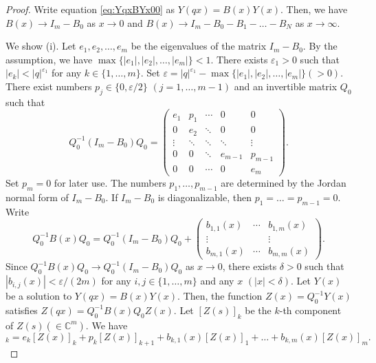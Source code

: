 \documentclass[10pt,a4paper]{amsart}
\begin{document}
\begin{proof}
Write equation \eqref{eq:YqxBYx00} as
$
Y(q x) = B(x) Y(x) $.
Then, we have $B(x) \to I_m -B_0$ as $x \to 0$ and $B(x) \to I_m -B_0 -B_1 - \dots - B_N$ as $x \to \infty$.

We show (i).
Let $e_1, e_2, \dots ,e_m$ be the eigenvalues of the matrix $I_m- B_0 $.
By the assumption, we have $\max \{ |e_1|, |e_2|, \dots , |e_m| \} <1 $.
There exists $\varepsilon _1 >0$ such that $|e_k | <|q|^{\varepsilon _1} $ for any $k \in \{1, \dots ,m \}$.
Set $ \varepsilon = |q|^{\varepsilon _1} - \max \{ |e_1|, |e_2|, \dots , |e_m| \} (>0)$.
There exist numbers $p_j \in \{ 0, \varepsilon /2 \}$ $(j=1, \dots , m-1)$ and an invertible matrix $Q_0$ such that
\begin{equation*}
 Q_0^{-1} ( I_m -B_0 ) Q_0 =
\begin{pmatrix}
e_1 & p_1 & \cdots & 0 & 0 \\
0 & e_2 & \ddots & 0 & 0 \\
\vdots & \ddots & \ddots & \ddots & \vdots \\
0 & 0 & \ddots & e_{m-1} & p_{m-1} \\
0 & 0 & \cdots & 0 & e_{m}
\end{pmatrix}.
\end{equation*}
Set $p_m=0$ for later use.
The numbers $p_1, \dots ,p_{m-1}$ are determined by the Jordan normal form of $ I_m -B_0 $.
If $I_m- B_0 $ is diagonalizable, then $p_1 = \dots = p_{m-1} =0$.
Write
\begin{equation} \label{eq:Q0-BxQ0}
 Q_0^{-1} B(x) Q_0 = Q_0^{-1} ( I_m -B_0 ) Q_0 + \begin{pmatrix}
b_{1,1} (x) & \cdots & b_{1,m} (x) \\
\vdots & & \vdots \\
 b_{m,1} (x) & \cdots & b_{m,m} (x)
\end{pmatrix}.
\end{equation}
Since $Q_0^{-1} B(x) Q_0 \to Q_0^{-1} ( I_m -B_0 ) Q_0 $ as $x \to 0$, there exists $\delta >0$ such that $|b_{i,j}(x)| < \varepsilon /(2m)$ for any $i,j \in \{1, \dots ,m \}$ and any $x$ $(|x| < \delta )$.
Let $Y (x)$ be a solution to $Y (qx) = B(x)Y (x)$.
Then, the function $Z(x) = Q_0^{-1} Y (x)$ satisfies $Z(qx) = Q_0^{-1} B(x) Q_0 Z(x)$.
Let $[Z(s )]_k $ be the $k$-th component of $Z(s ) (\in \mathbb{C} ^{m} )$.
We have
\begin{equation*}
[Z(qx )]_k = e_k [Z(x )]_k + p_k [Z(x )]_{k+1} + b_{k,1}(x) [Z(x )]_1 + \dots + b_{k,m}(x) [Z(x )]_m.
\end{equation*}

\end{proof}
\end{document}
